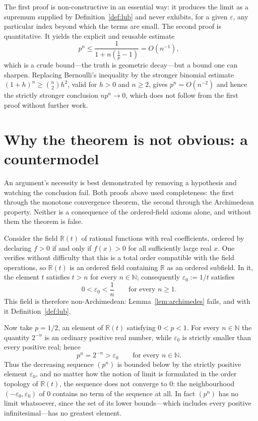 \documentclass{essay}
\begin{document}
\begin{remark}
  The first proof is non-constructive in an essential way: it produces the limit as a
  supremum supplied by Definition~\ref{def:lub} and never exhibits, for a given
  \(\varepsilon\), any particular index beyond which the terms are small. The second
  proof is quantitative. It yields the explicit and reusable estimate
  \[ p^{n} \leq \frac{1}{1 + n\left(\tfrac{1}{p} - 1\right)} = O(n^{-1}), \]
  which is a crude bound---the truth is geometric decay---but a bound one can
  sharpen. Replacing Bernoulli's inequality by the stronger binomial estimate
  \((1+h)^{n} \geq \binom{n}{2} h^{2}\), valid for \(h > 0\) and \(n \geq 2\), gives
  \(p^{n} = O(n^{-2})\) and hence the strictly stronger conclusion \(n p^{n} \to 0\),
  which does not follow from the first proof without further work.
\end{remark}

\section{Why the theorem is not obvious: a countermodel}
\label{sec:counterexample}

An argument's necessity is best demonstrated by removing a hypothesis and watching
the conclusion fail. Both proofs above used completeness: the first through the
monotone convergence theorem, the second through the Archimedean property. Neither
is a consequence of the ordered-field axioms alone, and without them the theorem is
false.

Consider the field \(\mathbb{R}(t)\) of rational functions with real coefficients,
ordered by declaring \(f > 0\) if and only if \(f(x) > 0\) for all sufficiently large
real \(x\). One verifies without difficulty that this is a total order compatible with
the field operations, so \(\mathbb{R}(t)\) is an ordered field containing \(\mathbb{R}\)
as an ordered subfield. In it, the element \(t\) satisfies \(t > n\) for every
\(n \in \mathbb{N}\); consequently \(\varepsilon_{0} := 1/t\) satisfies
\[ 0 < \varepsilon_{0} < \frac{1}{n} \qquad \text{for every } n \geq 1 . \]
This field is therefore non-Archimedean: Lemma~\ref{lem:archimedes} fails, and with
it Definition~\ref{def:lub}.

Now take \(p = 1/2\), an element of \(\mathbb{R}(t)\) satisfying \(0 < p < 1\). For every
\(n \in \mathbb{N}\) the quantity \(2^{-n}\) is an ordinary positive real number, while
\(\varepsilon_{0}\) is strictly smaller than every positive real; hence
\[ p^{n} = 2^{-n} > \varepsilon_{0} \qquad \text{for every } n \in \mathbb{N}. \]
Thus the decreasing sequence \((p^{n})\) is bounded below by the strictly positive
element \(\varepsilon_{0}\), and no matter how the notion of limit is formulated in
the order topology of \(\mathbb{R}(t)\), the sequence does not converge to \(0\): the
neighbourhood \((-\varepsilon_{0}, \varepsilon_{0})\) of \(0\) contains no term of the
sequence at all. In fact \((p^{n})\) has no limit whatsoever, since the set of its
lower bounds---which includes every positive infinitesimal---has no greatest
element.
\end{document}
